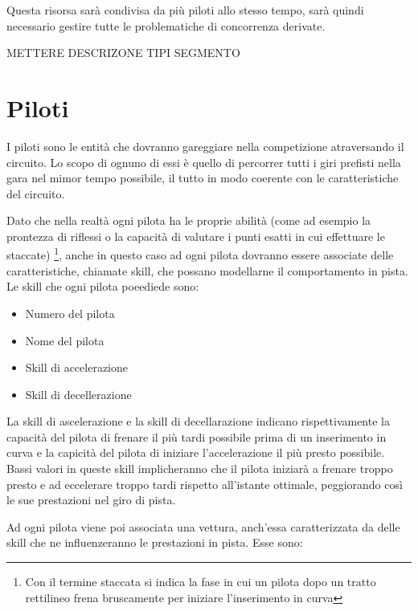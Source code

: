 \documentclass[a4paper,11pt, twoside]{book}
\begin{document}
	Questa risorsa sarà condivisa da più piloti allo stesso tempo, sarà quindi necessario gestire
	tutte le problematiche di concorrenza derivate.
	
	METTERE DESCRIZONE TIPI SEGMENTO
	
	
	
	
      
    \section{Piloti}
      I piloti sono le entità che dovranno gareggiare nella competizione atraversando il circuito.
      Lo scopo di ognuno di essi è quello di percorrer tutti i giri prefisti nella gara nel mimor tempo possibile,
      il tutto in modo coerente con le caratteristiche del circuito.
      
      Dato che nella realtà ogni pilota ha le proprie abilità (come ad esempio la prontezza di riflessi
      o la capacità di valutare i punti esatti in cui effettuare le staccate) \footnote{Con il termine staccata si indica 
      la fase in cui un pilota dopo un tratto rettilineo frena bruscamente per iniziare l'inserimento in curva},
      anche in questo caso ad ogni pilota dovranno essere associate delle caratteristiche, chiamate skill, che possano
      modellarne il comportamento in pista. Le skill che ogni pilota poeediede sono:
      
      \begin{itemize}
	\item Numero del pilota
	\item Nome del pilota
	\item Skill di accelerazione
	\item Skill di decellerazione
      \end{itemize}
      
      La skill di ascelerazione e la skill di decellarazione indicano rispettivamente la capacità del pilota di frenare 
      il più tardi possibile prima di un inserimento in curva e la capicità del pilota di iniziare l'accelerazione 
      il più presto possibile. Bassi valori in queste skill implicheranno che il pilota iniziarà a frenare troppo presto 
      e ad eccelerare troppo tardi rispetto all'istante ottimale, peggiorando così le sue prestazioni nel giro di pista.
      
      Ad ogni pilota viene poi associata una vettura, anch'essa caratterizzata da delle skill che ne influenzeranno
      le prestazioni in pista. Esse sono:
      
\end{document}
